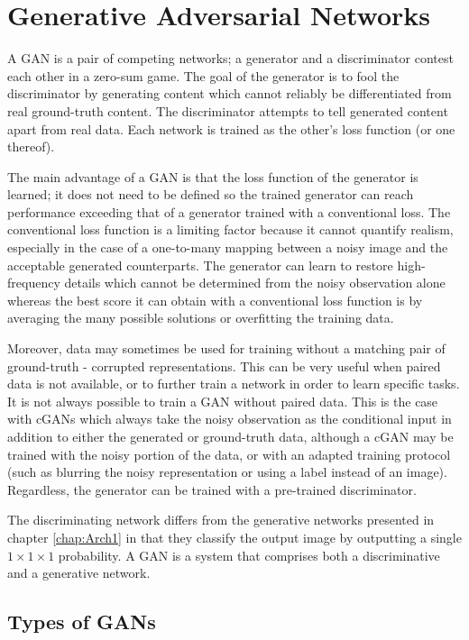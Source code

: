 \chapter{Generative Adversarial Networks}\label{chap:Arch2}

A \acf{GAN} is a pair of competing networks; a generator and a discriminator contest each other in a zero-sum game. The goal of the generator is to fool the discriminator by generating content which cannot reliably be differentiated from real ground-truth content. The discriminator attempts to tell generated content apart from real data. Each network is trained as the other's loss function (or one thereof).

The main advantage of a \ac{GAN} is that the loss function of the generator is learned; it does not need to be defined so the trained generator can reach performance exceeding that of a generator trained with a conventional loss. The conventional loss function is a limiting factor because it cannot quantify realism, especially in the case of a one-to-many mapping between a noisy image and the acceptable generated counterparts. The generator can learn to restore high-frequency details which cannot be determined from the noisy observation alone whereas the best score it can obtain with a conventional loss function is by averaging the many possible solutions or overfitting the training data.

Moreover, data may sometimes be used for training without a matching pair of ground-truth - corrupted representations. This can be very useful when paired data is not available, or to further train a network in order to learn specific tasks. It is not always possible to train a \ac{GAN} without paired data. This is the case with \acsp{cGAN} which always take the noisy observation as the conditional input in addition to either the generated or ground-truth data, although a \ac{cGAN} may be trained with the noisy portion of the data, or with an adapted training protocol (such as blurring the noisy representation or using a label instead of an image). Regardless, the generator can be trained with a pre-trained discriminator.

The discriminating network differs from the generative networks presented in chapter \ref{chap:Arch1} in that they classify the output image by outputting a single $1\times 1 \times 1$ probability. A \ac{GAN} is a system that comprises both a discriminative and a generative network.

\section{Types of GANs}

